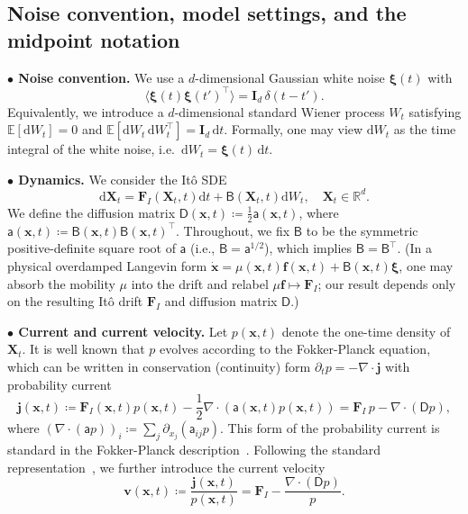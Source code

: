 \documentclass[
 longbibliography,
 twocolumn,
 superscriptaddress,
 amsmath,
 amssymb,
 amsthm,
 amsfonts,
 prl,
 floatfix,
]{revtex4-2}
\newcommand{\matbf}[1]{\boldsymbol{\mathsf{#1}}}
\begin{document}
\begin{widetext}
\subsection{Noise convention, model settings, and the midpoint notation}
\vspace*{-0.5\baselineskip}
\noindent\textbf{$\bullet$ Noise convention.} We use a $d$-dimensional Gaussian white noise $\bm{\xi}(t)$ with
\begin{equation}
    \langle\bm{\xi}(t)\bm{\xi}(t')^\intercal\rangle=\mathbf{I}_d\,\delta(t-t').
    \label{seq:noise_def}
\end{equation}
Equivalently, we introduce a $d$-dimensional standard Wiener process $W_t$ satisfying
$\mathbb{E}[\mathrm{d}W_t]=0$ and
$\mathbb{E}[\mathrm{d}W_t\,\mathrm{d}W_t^\intercal]=\mathbf{I}_d\,\mathrm{d}t$.
Formally, one may view $\mathrm{d}W_t$ as the time integral of the white noise,
i.e.\ $\mathrm{d}W_t = \bm{\xi}(t)\,\mathrm{d}t$.

\bigskip
\noindent\textbf{$\bullet$ Dynamics.} We consider the Itô SDE
\begin{equation}
    \mathrm{d}\bm{X}_t=\bm{F}_I(\bm{X}_t,t)\mathrm{d}t+\matbf{B}(\bm{X}_t,t)\mathrm{d}W_t,\quad\bm{X}_t\in\mathbb{R}^d.
    \label{seq:dynamics_def}
\end{equation}
We define the diffusion matrix $\matbf{D}(\bm{x},t)\coloneq\frac{1}{2}\matbf{a}(\bm{x},t)$,
where $\matbf{a}(\bm{x},t)\coloneq\matbf{B}(\bm{x},t)\matbf{B}(\bm{x},t)^\intercal$. Throughout, we fix $\matbf{B}$ to be the symmetric positive-definite square root of $\matbf{a}$ (i.e., $\matbf{B}=\matbf{a}^{1/2}$), which implies $\matbf{B}=\matbf{B}^\intercal$.
(In a physical overdamped Langevin form $\dot{\bm{x}}=\matbf{\mu}(\bm{x},t)\bm{f}(\bm{x},t)+\matbf{B}(\bm{x},t)\bm{\xi}$, one may absorb the mobility $\matbf{\mu}$ into the drift and relabel $\matbf{\mu}\bm{f}\mapsto\bm{F}_I$; our result depends only on the resulting It\^{o} drift $\bm{F}_I$ and diffusion matrix $\matbf{D}$.)

\bigskip
\noindent\textbf{$\bullet$ Current and current velocity.}
Let $p(\bm{x},t)$ denote the one-time density of $\bm{X}_t$. It is well known that $p$ evolves according to the Fokker-Planck equation, which can be written in conservation (continuity) form $\partial_tp=-\nabla\cdot\bm{j}$ with probability current
\begin{equation}
    \bm{j}(\bm{x},t)\coloneq\bm{F}_I(\bm{x},t)p(\bm{x},t)-
    \frac{1}{2}\nabla\cdot(\matbf{a}(\bm{x},t)p(\bm{x},t))=
    \bm{F}_I\,p-\nabla\cdot(\matbf{D}p),
    \label{seq:def_j}
\end{equation}
where $(\nabla\cdot(\matbf{a}p))_i\coloneq\sum_j\partial_{x_j}(\mathsf{a}_{ij}p)$.
This form of the probability current is standard in the Fokker-Planck description~\cite{risken1996fokkerplanck,gardiner2009stochastic}.
Following the standard representation~\cite{nelson1967dynamical, seifert2012stochastic}, we further introduce the current velocity 
\begin{equation}
    \bm{v}(\bm{x},t)\coloneq\frac{\bm{j}(\bm{x},t)}{p(\bm{x},t)}
    =\bm{F}_I-\frac{\nabla\cdot(\matbf{D}p)}{p}.
    \label{seq:def_v}
\end{equation}


\end{widetext}
\end{document}
